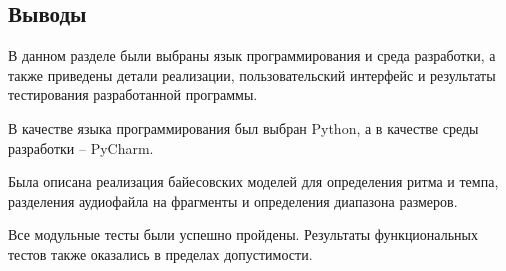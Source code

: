 \clearpage

\subsection*{Выводы}

В данном разделе были выбраны язык программирования и среда разработки, а также приведены детали реализации, пользовательский интерфейс и результаты тестирования разработанной программы.

В качестве языка программирования был выбран Python, а в качестве среды разработки -- PyCharm.

Была описана реализация байесовских моделей для определения ритма и темпа, разделения аудиофайла на фрагменты и определения диапазона размеров.

Все модульные тесты были успешно пройдены. Результаты функциональных тестов также оказались в пределах допустимости.
